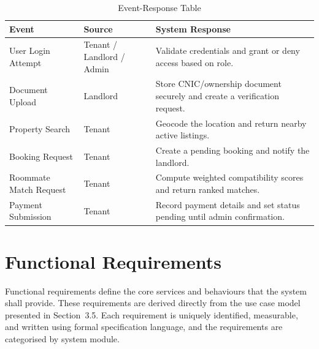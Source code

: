 \begin{table}[h]
\centering
\caption{Event-Response Table}

\begin{tabularx}{\textwidth}{
|>{\raggedright\arraybackslash}p{3.5cm}
|>{\raggedright\arraybackslash}p{3cm}
|>{\raggedright\arraybackslash}X|}

\hline
\textbf{Event} & \textbf{Source} & \textbf{System Response} \\ \hline

User Login Attempt & Tenant / Landlord / Admin & Validate credentials and grant or deny access based on role. \\ \hline

Document Upload & Landlord & Store CNIC/ownership document securely and create a verification request. \\ \hline

Property Search & Tenant & Geocode the location and return nearby active listings. \\ \hline

Booking Request & Tenant & Create a pending booking and notify the landlord. \\ \hline

Roommate Match Request & Tenant & Compute weighted compatibility scores and return ranked matches. \\ \hline

Payment Submission & Tenant & Record payment details and set status pending until admin confirmation. \\ \hline

\end{tabularx}

\end{table}

\section{Functional Requirements}

Functional requirements define the core services and behaviours that the system shall provide. These requirements are derived directly from the use case model presented in Section~3.5. Each requirement is uniquely identified, measurable, and written using formal specification language, and the requirements are categorised by system module.

